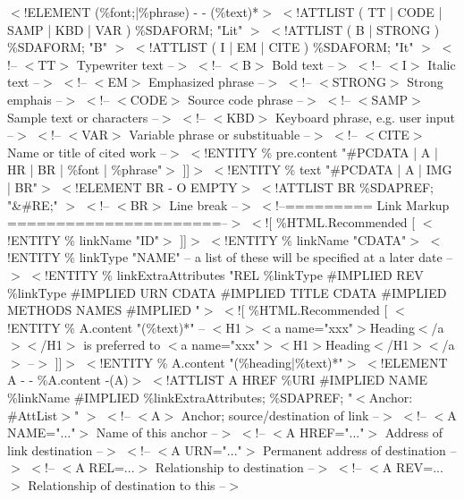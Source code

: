 $<$!ELEMENT (\%font;|\%phrase) - - (\%text)*$>$
$<$!ATTLIST ( TT | CODE | SAMP | KBD | VAR )
        \%SDAFORM; "Lit"
        $>$
$<$!ATTLIST ( B | STRONG )
        \%SDAFORM; "B"
        $>$
$<$!ATTLIST ( I | EM | CITE )
        \%SDAFORM; "It"
        $>$
$<$!-- $<$TT$>$       Typewriter text                         --$>$
$<$!-- $<$B$>$        Bold text                               --$>$
$<$!-- $<$I$>$        Italic text                             --$>$
$<$!-- $<$EM$>$       Emphasized phrase                       --$>$
$<$!-- $<$STRONG$>$   Strong emphais                          --$>$
$<$!-- $<$CODE$>$     Source code phrase                      --$>$
$<$!-- $<$SAMP$>$     Sample text or characters               --$>$
$<$!-- $<$KBD$>$      Keyboard phrase, e.g. user input        --$>$
$<$!-- $<$VAR$>$      Variable phrase or substituable         --$>$
$<$!-- $<$CITE$>$     Name or title of cited work             --$>$
$<$!ENTITY \% pre.content "\#PCDATA | A | HR | BR | \%font | \%phrase"$>$
]]$>$
$<$!ENTITY \% text "\#PCDATA | A | IMG | BR"$>$
$<$!ELEMENT BR    - O EMPTY$>$
$<$!ATTLIST BR
        \%SDAPREF; "\&\#RE;"
        $>$
$<$!-- $<$BR$>$       Line break      --$>$
$<$!--========= Link Markup ======================--$>$
$<$![ \%HTML.Recommended [
        $<$!ENTITY \% linkName "ID"$>$
]]$>$
$<$!ENTITY \% linkName "CDATA"$>$
$<$!ENTITY \% linkType "NAME"
        -- a list of these will be specified at a later date --$>$
$<$!ENTITY \% linkExtraAttributes
        "REL \%linkType \#IMPLIED
        REV \%linkType \#IMPLIED
        URN CDATA \#IMPLIED
        TITLE CDATA \#IMPLIED
        METHODS NAMES \#IMPLIED
        "$>$
$<$![ \%HTML.Recommended [
        $<$!ENTITY \% A.content   "(\%text)*"
        -- $<$H1$>$$<$a name="xxx"$>$Heading$<$/a$>$$<$/H1$>$
                is preferred to
           $<$a name="xxx"$>$$<$H1$>$Heading$<$/H1$>$$<$/a$>$
        --$>$
]]$>$
$<$!ENTITY \% A.content   "(\%heading|\%text)*"$>$
$<$!ELEMENT A     - - \%A.content -(A)$>$
$<$!ATTLIST A
        HREF \%URI \#IMPLIED
        NAME \%linkName \#IMPLIED
        \%linkExtraAttributes;
        \%SDAPREF; "$<$Anchor: \#AttList$>$"
        $>$
$<$!-- $<$A$>$               Anchor; source/destination of link    --$>$
$<$!-- $<$A NAME="..."$>$     Name of this anchor                --$>$
$<$!-- $<$A HREF="..."$>$     Address of link destination         --$>$
$<$!-- $<$A URN="..."$>$      Permanent address of destination     --$>$
$<$!-- $<$A REL=...$>$        Relationship to destination       --$>$
$<$!-- $<$A REV=...$>$        Relationship of destination to this    --$>$
